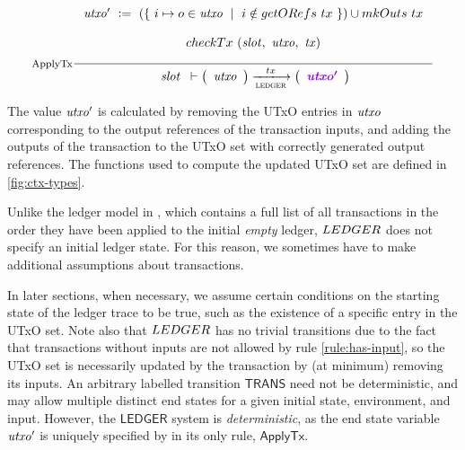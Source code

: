   \begin{equation}
  \label{fig:ledger-rule}
    \inference[ApplyTx]
    {
    \var{utxo'}~\leteq~(\{~i\mapsto o \in \var{utxo} ~\mid~ i \notin \fun{getORefs}~{tx}~\}) \cup \fun{mkOuts}~{tx}
    \\ ~ \\
    \fun{checkTx}~(\var{slot},~\var{utxo},~\var{tx})
    \\ ~ \\
    }
    {
    \begin{array}{l}
      \var{slot}\\
    \end{array}
      \vdash
      \left(
      \begin{array}{r}
        \var{utxo} \\
      \end{array}
      \right)
      \trans{ledger}{tx}
      \left(
      \begin{array}{r}
        \varUpdate{\var{utxo'}}  \\
      \end{array}
      \right) \\
    }
  \end{equation}

The value $\mathit{utxo'}$ is calculated by removing the UTxO entries in $\mathit{utxo}$
corresponding to the output references of the transaction inputs, and adding the outputs of the
transaction to the UTxO set with correctly generated output references.
The functions used to compute the updated UTxO set are defined in \ref{fig:ctx-types}.

Unlike the
ledger model in \cite{eutxoma}, which contains a full list of all transactions in
the order they have been applied to the initial \emph{empty} ledger,
$\LEDGER$ does not specify an initial ledger state. For this reason, we
sometimes have to make additional assumptions about transactions.

In later sections,
when necessary, we assume certain conditions on
the starting state of the ledger trace to be true, such as the existence of a specific
entry in the UTxO set. Note also that $\LEDGER$
has no trivial transitions due to the fact that transactions without
inputs are not allowed by rule \ref{rule:has-input}, so the UTxO set is necessarily updated
by the transaction by (at minimum) removing its inputs.
An arbitrary labelled transition $\mathsf{TRANS}$ need not be deterministic,
and may allow multiple distinct end states for a given initial state, environment,
and input. However, the $\mathsf{LEDGER}$ system is \emph{deterministic}, as the
end state variable $\mathit{utxo'}$ is uniquely specified by in its only rule, $\mathsf{ApplyTx}$.
